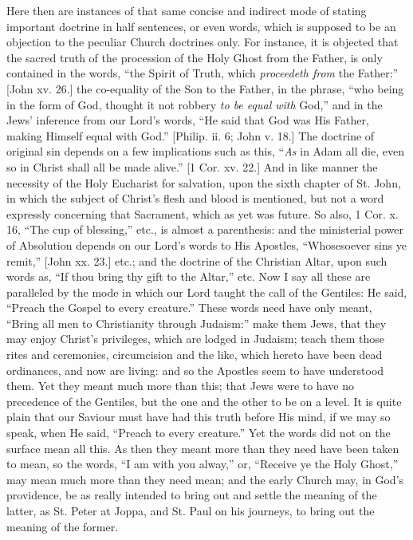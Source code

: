 Here then are instances of that same concise and indirect mode of
stating important doctrine in half sentences, or even words, which is
supposed to be an objection to the peculiar Church doctrines only. For
instance, it is objected that the sacred truth of the procession of
the Holy Ghost from the Father, is only contained in the words,
``the Spirit of Truth, which \emph{proceedeth from} the
Father:'' [John xv. 26.] the co-equality of the Son to the Father,
in the phrase, ``who being in the form of God, thought it not
robbery \emph{to be equal with} God,'' and in the Jews' inference
from our Lord's words, ``He said that God was His Father, making
Himself equal with God.'' [Philip. ii. 6; John v. 18.] The
doctrine of original sin depends on a few implications such as this,
``\emph{As} in Adam all die, even so in Christ shall all be made
alive.'' [1 Cor. xv. 22.] And in like manner the necessity of the
Holy Eucharist for salvation, upon the sixth chapter of St. John, in
which the subject of Christ's flesh and blood is mentioned, but not a
word expressly concerning that Sacrament, which as yet was future. So
also, 1 Cor. x. 16, ``The cup of blessing,'' etc., is almost a
parenthesis: and the ministerial power of Absolution depends on our
Lord's words to His Apostles, ``Whosesoever sins ye remit,''
[John xx. 23.] etc.; and the doctrine of the Christian Altar, upon
such words as, ``If thou bring thy gift to the Altar,'' etc.
Now I say all these are paralleled by the mode in which our Lord
taught the call of the Gentiles: He said, ``Preach the Gospel to
every creature.'' These words need have only meant,
``Bring all men to Christianity through Judaism:'' make them
Jews, that they may enjoy Christ's privileges, which are lodged in
Judaism; teach them those rites and ceremonies, circumcision and the
like, which hereto have been dead ordinances, and now are living: and
so the Apostles seem to have understood them. Yet they meant much more
than this; that Jews were to have no precedence of the Gentiles, but
the one and the other to be on a level. It is quite plain that our
Saviour must have had this truth before His mind, if we may so speak,
when He said, ``Preach to every creature.'' Yet the words did
not on the surface mean all this. As then they meant more than they
need have been taken to mean, so the words, ``I am with you alway,''
or, ``Receive ye the Holy Ghost,'' may mean much more than
they need mean; and the early Church may, in God's providence, be as
really intended to bring out and settle the meaning of the latter, as
St. Peter at Joppa, and St. Paul on his journeys, to bring out the
meaning of the former.

